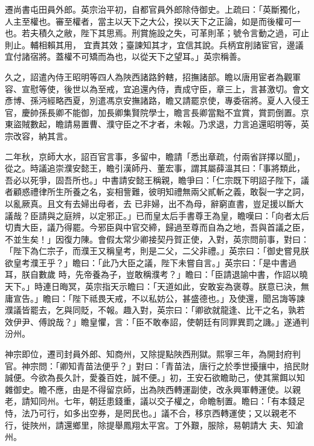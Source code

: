\begin{pinyinscope}
 遷尚書屯田員外郎。英宗治平初，自都官員外郎除侍御史。上疏曰：「英斷獨化，人主至權也。審至權者，當主以天下之大公，揆以天下之正論，如是而後權可一也。若夫積久之敝，陛下其思焉。刑賞施設之失，可革則革；號令言動之過，可止則止。輔相賴其用，
 宜責其效；臺諫知其才，宜信其說。兵柄宜削諸宦官，邊議宜付諸宿將。蓋權不可矯而為也，以從天下之望耳。」英宗稱善。



 久之，詔遣內侍王昭明等四人為陜西諸路鈐轄，招撫諸部。瞻以唐用宦者為觀軍容、宣慰等使，後世以為至戒，宜追還內侍，責成守臣，章三上，言甚激切。會文彥博、孫沔經略西夏，別遣馮京安撫諸路，瞻又請罷京使，專委宿將。夏人入侵王官，慶帥孫長卿不能御，加長卿集賢院學士，瞻言長卿當黜不宜賞，賞罰倒置。京
 東盜賊數起，瞻請易置曹、濮守臣之不才者，未報。乃求退，力言追還昭明等，英宗改容，納其言。



 二年秋，京師大水，詔百官言事，多留中，瞻請「悉出章疏，付兩省詳擇以聞」，從之。時議追崇濮安懿王，瞻引漢師丹、董宏事，謂其屬薛溫其曰：「事將類此，吾必以死爭，固吾所也。」中書請安懿王稱親，瞻爭曰：「仁宗既下明詔子陛下，議者顧惑禮律所生所養之名，妄相訾難，彼明知禮無兩父貳斬之義，敢裂一字之詞，以亂厥真。且文有去婦出母者，去
 已非婦，出不為母，辭窮直書，豈足援以斷大議哉？臣請與之庭辨，以定邪正。」已而皇太后手書尊王為皇，瞻嘆曰：「向者太后切責大臣，議乃得罷。今邪臣與中官交締，歸過至尊而自為之地，吾與首議之臣，不並生矣！」因復力陳。會假太常少卿接契丹賀正使，入對，英宗問前事，對曰：「陛下為仁宗子，而濮王又稱皇考，則是二父，二父非禮。」英宗曰：「御史嘗見朕欲皇考濮王乎？」瞻曰：「此乃大臣之議，陛下未嘗自言。」英宗曰：「是中書過耳，朕自數歲
 時，先帝養為子，豈敢稱濮考？」瞻曰：「臣請退諭中書，作詔以曉天下。」時連日晦冥，英宗指天示瞻曰：「天道如此，安敢妄為褒尊。朕意已決，無庸宣告。」瞻曰：「陛下祗畏天戒，不以私妨公，甚盛德也。」及使還，聞呂誨等諫濮議皆罷去，乞與同貶，不報。趣入對，英宗曰：「卿欲就龍逢、比干之名，孰若效伊尹、傅說哉？」瞻皇懼，言：「臣不敢奉詔，使朝廷有同罪異罰之譏。」遂通判汾州。



 神宗即位，遷司封員外郎、知商州，又除提點陜西刑獄。熙寧三年，為開封府判
 官。神宗問：「卿知青苗法便乎？」對曰：「青苗法，唐行之於季世擾攘中，掊民財誠便。今欲為長久計，愛養百姓，誠不便。」初，王安石欲瞻助己，使其黨餌以知雜御史。瞻不應，由是不得留京師，出為陜西轉運副使，改永興軍轉運使。以親老，請知同州。七年，朝廷患錢重，議以交子權之，命瞻制置。瞻曰：「有本錢足恃，法乃可行，如多出空券，是罔民也。」議不合，移京西轉運使；又以親老不行，徙陜州，請還鄉里，除提舉鳳翔太平宮。丁外艱，服除，易朝請大
 夫、知滄州。




\end{pinyinscope}
